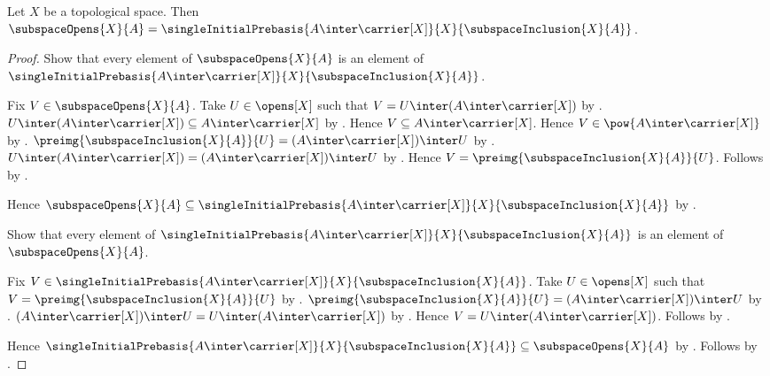 \begin{theorem}\label{subspace_opens_are_single_initial_opens}
    Let $X$ be a topological space.
    Then $\subspaceOpens{X}{A}
        =\singleInitialPrebasis{A\inter\carrier[X]}{X}
            {\subspaceInclusion{X}{A}}$.
\end{theorem}
\begin{proof}
    Show that every element of $\subspaceOpens{X}{A}$ is an element of
        $\singleInitialPrebasis{A\inter\carrier[X]}{X}
            {\subspaceInclusion{X}{A}}$.
    \begin{subproof}
        Fix $V\in\subspaceOpens{X}{A}$.
        Take $U\in\opens[X]$ such that
            $V=U\inter(A\inter\carrier[X])$ by
            .
        $U\inter(A\inter\carrier[X])\subseteq
            A\inter\carrier[X]$ by .
        Hence $V\subseteq A\inter\carrier[X]$.
        Hence $V\in\pow{A\inter\carrier[X]}$ by
            .
        $\preimg{\subspaceInclusion{X}{A}}{U}
            =(A\inter\carrier[X])\inter U$ by
            .
        $U\inter(A\inter\carrier[X])
            =(A\inter\carrier[X])\inter U$ by .
        Hence $V=\preimg{\subspaceInclusion{X}{A}}{U}$.
        Follows by .
    \end{subproof}
    Hence $\subspaceOpens{X}{A}\subseteq
        \singleInitialPrebasis{A\inter\carrier[X]}{X}
            {\subspaceInclusion{X}{A}}$ by
        .

    Show that every element of
        $\singleInitialPrebasis{A\inter\carrier[X]}{X}
            {\subspaceInclusion{X}{A}}$
        is an element of $\subspaceOpens{X}{A}$.
    \begin{subproof}
        Fix $V\in
            \singleInitialPrebasis{A\inter\carrier[X]}{X}
                {\subspaceInclusion{X}{A}}$.
        Take $U\in\opens[X]$ such that
            $V=\preimg{\subspaceInclusion{X}{A}}{U}$ by
            .
        $\preimg{\subspaceInclusion{X}{A}}{U}
            =(A\inter\carrier[X])\inter U$ by
            .
        $(A\inter\carrier[X])\inter U
            =U\inter(A\inter\carrier[X])$ by .
        Hence $V=U\inter(A\inter\carrier[X])$.
        Follows by .
    \end{subproof}
    Hence $\singleInitialPrebasis{A\inter\carrier[X]}{X}
        {\subspaceInclusion{X}{A}}
        \subseteq\subspaceOpens{X}{A}$ by .
    Follows by .
\end{proof}

